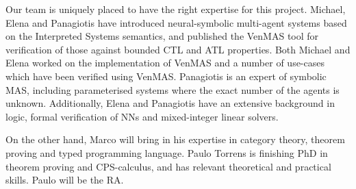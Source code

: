 \documentclass[11pt]{article}
\begin{document}

Our team is uniquely placed to have the right expertise for this
project. Michael, Elena and Panagiotis have introduced neural-symbolic
multi-agent systems based on the Interpreted Systems semantics, and
published the VenMAS tool for verification of those against bounded
CTL and ATL properties.  Both Michael and Elena worked on the
implementation of VenMAS and a number of use-cases which have been
verified using VenMAS.  Panagiotis is an expert of symbolic MAS,
including parameterised systems where the exact number of the agents
is unknown.  Additionally, Elena and Panagiotis have an extensive
background in logic, formal verification of NNs and mixed-integer
linear solvers.

On the other hand, Marco will bring in his expertise in category
theory, theorem proving and typed programming language.  Paulo Torrens
is finishing PhD in theorem proving and CPS-calculus, and has relevant
theoretical and practical skills. Paulo will be the RA.

 



\end{document}
